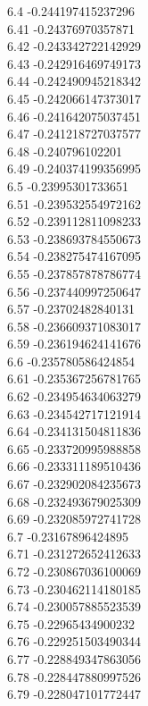 {6.4	-0.244197415237296\\
6.41	-0.24376970357871\\
6.42	-0.243342722142929\\
6.43	-0.242916469749173\\
6.44	-0.242490945218342\\
6.45	-0.242066147373017\\
6.46	-0.241642075037451\\
6.47	-0.241218727037577\\
6.48	-0.240796102201\\
6.49	-0.240374199356995\\
6.5	-0.23995301733651\\
6.51	-0.239532554972162\\
6.52	-0.239112811098233\\
6.53	-0.238693784550673\\
6.54	-0.238275474167095\\
6.55	-0.237857878786774\\
6.56	-0.237440997250647\\
6.57	-0.23702482840131\\
6.58	-0.236609371083017\\
6.59	-0.236194624141676\\
6.6	-0.235780586424854\\
6.61	-0.235367256781765\\
6.62	-0.234954634063279\\
6.63	-0.234542717121914\\
6.64	-0.234131504811836\\
6.65	-0.233720995988858\\
6.66	-0.233311189510436\\
6.67	-0.232902084235673\\
6.68	-0.232493679025309\\
6.69	-0.232085972741728\\
6.7	-0.23167896424895\\
6.71	-0.231272652412633\\
6.72	-0.230867036100069\\
6.73	-0.230462114180185\\
6.74	-0.230057885523539\\
6.75	-0.22965434900232\\
6.76	-0.229251503490344\\
6.77	-0.228849347863056\\
6.78	-0.228447880997526\\
6.79	-0.228047101772447\\
}
